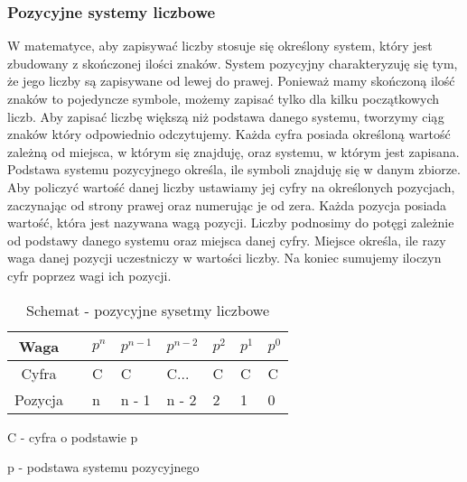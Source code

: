 \documentclass[12pt, a4paper, onside, polish]{article}				%
\begin{document}
\cleardoublepage


\subsubsection{Pozycyjne systemy liczbowe}
\hspace{\parindent}
W matematyce, aby zapisywać liczby stosuje się określony system, który jest zbudowany z skończonej ilości znaków. System pozycyjny charakteryzuję się tym, że jego liczby są zapisywane od lewej do prawej. Ponieważ mamy skończoną ilość znaków to pojedyncze symbole, możemy zapisać tylko dla kilku początkowych liczb. Aby zapisać liczbę większą niż podstawa danego systemu, tworzymy ciąg znaków który odpowiednio odczytujemy. Każda cyfra posiada określoną wartość zależną od miejsca, w którym się znajduję, oraz systemu, w którym jest zapisana. Podstawa systemu pozycyjnego określa, ile symboli znajduję się w danym zbiorze. Aby policzyć wartość danej liczby ustawiamy jej cyfry na określonych pozycjach, zaczynając od strony prawej oraz numerując je od zera. Każda pozycja posiada wartość, która jest nazywana wagą pozycji. Liczby podnosimy do potęgi zależnie od podstawy danego systemu oraz miejsca danej cyfry. Miejsce określa, ile razy waga danej pozycji uczestniczy w wartości liczby. Na koniec sumujemy iloczyn cyfr poprzez wagi ich pozycji.  

\begin{table}[htb]
\caption{Schemat - pozycyjne sysetmy liczbowe}
\centering
\begin{tabular}{|cl|l|l|l|l|l|l|}
\hline
Waga    &  & $p^{n}$ & $p^{n - 1}$ & $p^{n - 2}$ & $p^{2}$ & $p^{1}$ & $p^{0}$ \\ \hline
Cyfra   &  & C                    & C                      & C...                   & C                    & C                    & C                    \\ \hline
Pozycja &  & n                    & n - 1                    & n - 2                    & 2                    & 1                    & 0                    \\ \hline
\end{tabular}
\end{table}

C - cyfra o podstawie p

p - podstawa systemu pozycyjnego
\end{document}

